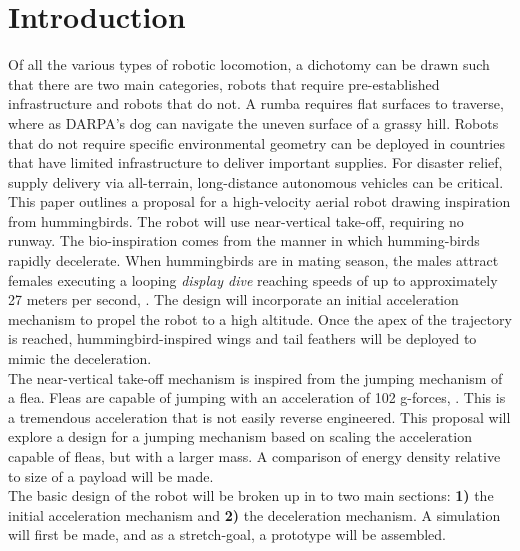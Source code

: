 \section{Introduction}
\label{intro}

\indent Of all the various types of robotic locomotion, a dichotomy can be drawn such that there are two main categories, robots that require pre-established infrastructure and robots that do not. A rumba requires flat surfaces to traverse, where as DARPA's dog can navigate the uneven surface of a grassy hill. Robots that do not require specific environmental geometry can be deployed in countries that have limited infrastructure to deliver important supplies. For disaster relief, supply delivery via all-terrain, long-distance autonomous vehicles can be critical.\\

\indent This paper outlines a proposal for a high-velocity aerial robot drawing
inspiration from hummingbirds. The robot will use near-vertical take-off, requiring no runway. The bio-inspiration comes from the manner in which humming-birds rapidly decelerate. When hummingbirds are in mating season, the males attract females executing a looping \textit{display dive} reaching speeds of up to approximately 27 meters per second, \cite{Clark:2009}. The design will incorporate an initial acceleration mechanism to propel the robot to a high altitude. Once the apex of the trajectory is reached, hummingbird-inspired wings and tail feathers will be deployed to mimic the deceleration.\\

\indent The near-vertical take-off mechanism is inspired from the jumping mechanism of a flea. Fleas are capable of jumping with an acceleration of 102 g-forces, \cite[p.~62]{Bennet:1967}. This is a tremendous acceleration that is not easily reverse engineered. This proposal will explore a design for a jumping mechanism based on  scaling the acceleration capable of fleas, but with a larger mass. A comparison of energy density relative to size of a payload will be made.\\

\indent The basic design of the robot will be broken up in to two main sections: \textbf{1)} the initial acceleration mechanism and \textbf{2)} the deceleration mechanism. A simulation will first be made, and as a stretch-goal, a prototype will be assembled.\\